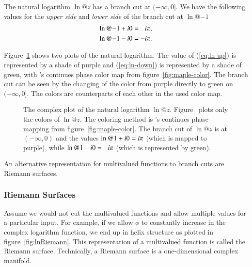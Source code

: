 The natural logarithm $\ln@{z}$ has a branch cut at $(-\infty,0]$. We have the following values for the \textit{upper side} and \textit{lower side} of the branch cut at $\ln@{-1}$
\begin{align}
\ln@{-1+\iunit 0} &=\hphantom{-}\iunit \cpi,\label{eq:ln-up}\\
\ln@{-1-\iunit 0} &= -\iunit \cpi.\label{eq:ln-down}
\end{align}

Figure~\ref{fig:ln-compl-comp} shows two plots of the natural logarithm. The value of (\ref{eq:ln-up}) is represented by a shade of purple and (\ref{eq:ln-down}) is represented by a shade of green, with \Maple's continues phase color map from figure~\ref{fig:maple-color}. The branch cut can be seen by the changing of the color from purple directly to green on $(-\infty,0]$. The colors are counterparts of each other in the used color map.

\begin{figure}[!htp]
    \centering
    \hspace{0.5cm}
    \caption{The complex plot of the natural logarithm $\ln@{z}$. Figure~\protect{} plots only the colors of $\ln@{z}$. The coloring method is \Maple's continues phase mapping from figure~\protect\ref{fig:maple-color}. The branch cut of $\ln@{z}$ is at $(-\infty,0)$ and the values $\ln@{1+\iunit 0} = \iunit \cpi$ (which is mapped to purple), while $\ln@{1-\iunit 0} = -\iunit \cpi$ (which is represented by green).}
    \label{fig:ln-compl-comp}
\end{figure}

An alternative representation for multivalued functions to branch cuts are Riemann surfaces.

\subsubsection{Riemann Surfaces}
Assume we would not cut the multivalued functions and allow multiple values for a particular input. For example, if we allow $\phi$ to constantly increase in the complex logarithm function, we end up in helix structure as plotted in figure~\ref{fig:lnRiemann}. This representation of a multivalued function is called the Riemann surface. Technically, a Riemann surface is a one-dimensional complex manifold.

